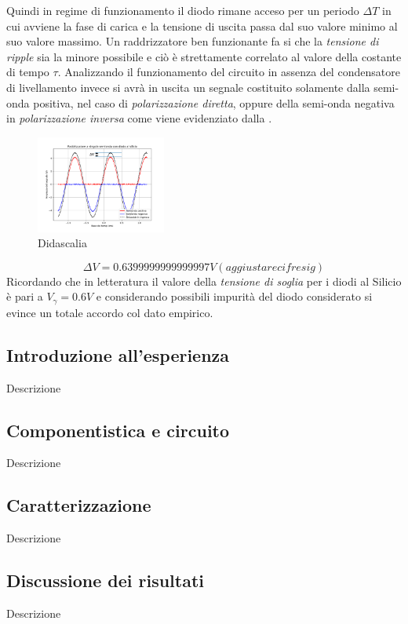 \documentclass[journal]{IEEEtran}
\begin{document}
Quindi in regime di funzionamento il diodo rimane acceso per un periodo $\Delta T$ in cui avviene la fase di carica e la tensione di uscita passa dal suo valore minimo al suo valore massimo. Un raddrizzatore ben funzionante fa si che la \textit{tensione di ripple} sia la minore possibile e ciò è strettamente correlato al valore della costante di tempo $\tau$.
Analizzando il funzionamento del circuito in assenza del condensatore di livellamento invece si avrà in uscita un segnale costituito solamente dalla semi-onda positiva, nel caso di \textit{polarizzazione diretta}, oppure della semi-onda negativa in \textit{polarizzazione inversa} come viene evidenziato dalla .
\begin{figure}[H]%
\begin {center}
\includegraphics[width=0.38\textwidth]{analysis/output/half-wave-rectifier.pdf}
\caption{Didascalia}
\label{fig:oscilloscope}
\end {center}
\end{figure}
\[\Delta V = 0.6399999999999997 V (aggiustare cifre sig)\] 
Ricordando che in letteratura il valore della \textit{tensione di soglia} per i diodi al Silicio è pari a $V_{\gamma}=0.6V$ e considerando possibili impurità del diodo considerato si evince un totale accordo col dato empirico.




\subsection{\textbf{Introduzione all'esperienza}}
Descrizione

\subsection{\textbf{Componentistica e circuito}}
Descrizione

\subsection{\textbf{Caratterizzazione}}
Descrizione

\subsection{\textbf{Discussione dei risultati}}
Descrizione
\end{document}
